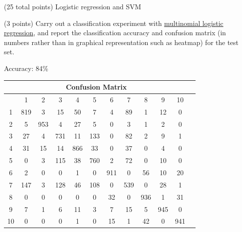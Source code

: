 \documentclass[12pt]{article}
\begin{document}
\begin{question}{(25 total points) Logistic regression and SVM}

  


  \medskip
   \begin{subquestion}{(3 points)
       Carry out a classification experiment with
       \href{https://scikit-learn.org/0.19/modules/generated/sklearn.linear\_model.LogisticRegression.html}{multinomial logistic regression},
       and report the classification accuracy and confusion matrix (in
       numbers rather than in graphical representation such as heatmap)
       for the test set.
     } \label{Q2.1}


   

      \begin{answerbox}{30em}
      Accuracy: 84\% \\
    		\begin{tabular}{|c|c|c|c|c|c|c|c|c|c|c|c|}
      		\hline 
      		\multicolumn{11}{|c|}{Confusion Matrix} \\ \hline
& 1 & 2 & 3 & 4 & 5 & 6 & 7 & 8 & 9 & 10\\ \hline
1 & 819 & 3 & 15 & 50 & 7 & 4 & 89 & 1 & 12 & 0 \\ \hline 
2 & 5 & 953 & 4 & 27 & 5 & 0 & 3 & 1 & 2 & 0 \\ \hline 
3 & 27 & 4 & 731 & 11 & 133 & 0 & 82 & 2 & 9 & 1 \\ \hline 
4 & 31 & 15 & 14 & 866 & 33 & 0 & 37 & 0 & 4 & 0 \\ \hline 
5 & 0 & 3 & 115 & 38 & 760 & 2 & 72 & 0 & 10 & 0 \\ \hline 
6 & 2 & 0 & 0 & 1 & 0 & 911 & 0 & 56 & 10 & 20 \\ \hline 
7 & 147 & 3 & 128 & 46 & 108 & 0 & 539 & 0 & 28 & 1 \\ \hline 
8 & 0 & 0 & 0 & 0 & 0 & 32 & 0 & 936 & 1 & 31 \\ \hline 
9 & 7 & 1 & 6 & 11 & 3 & 7 & 15 & 5 & 945 & 0 \\ \hline 
10 & 0 & 0 & 0 & 1 & 0 & 15 & 1 & 42 & 0 & 941
			\\\hline
      		\end{tabular} 
      \end{answerbox}
  



\end{subquestion}
\end{question}
\end{document}
